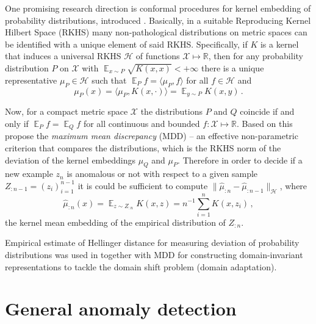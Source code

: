 \documentclass{extarticle}
\newcommand{\ex}{\mathop{\mathbb{E}}\nolimits}
\newcommand{\Hcal}{\mathcal{H}}
\newcommand{\Xcal}{\mathcal{X}}
\newcommand{\Real}{\mathbb{R}}
\begin{document}
One promising research direction is conformal procedures for kernel embedding of
probability distributions, introduced \cite{smola2007}. Basically, in a suitable
Reproducing Kernel Hilbert Space (RKHS) many non-pathological distributions on
metric spaces can be identified with a unique element of said RKHS. Specifically,
if $K$ is a kernel that induces a universal RKHS $\Hcal$ of functions $\Xcal\mapsto\Real$,
then for any probability distribution $P$ on $\Xcal$ with $\ex_{x\sim P} \sqrt{K(x,x)} < +\infty$
there is a unique representative $\mu_P\in \Hcal$ such that $\ex_P f = \langle \mu_P, f\rangle$
for all $f\in \Hcal$ and
\begin{equation*}
  \mu_P(x) = \langle \mu_P, K(x, \cdot) \rangle = \ex_{y\sim P} K(x, y) \,.
\end{equation*}

Now, for a compact metric space $\Xcal$ the distributions $P$ and $Q$ coincide if
and only if $\ex_P f = \ex_Q f$ for all continuous and bounded $f:\Xcal\mapsto \Real$.
Based on this \cite{gretton2012} propose the \textit{maximum mean discrepancy} (MDD)
-- an effective non-parametric criterion that compares the distributions, which is
the RKHS norm of the deviation of the kernel embeddings $\mu_Q$ and $\mu_P$. Therefore
in order to decide if a new example $z_n$ is anomalous or not with respect to a given
sample $Z_{:n-1} = (z_i)_{i=1}^{n-1}$ it is could be sufficient to compute
$\|\hat{\mu}_{:n} - \hat{\mu}_{:n-1}\|_\Hcal$, where
\begin{equation*}
  \hat{\mu}_{:n}(x) = \ex_{z\sim Z_{:n}} K(x, z) = n^{-1} \sum_{i=1}^n K(x, z_i) \,,
\end{equation*}
the kernel mean embedding of the empirical distribution of $Z_{:n}$.

Empirical estimate of Hellinger distance for measuring deviation of probability
distributions was used in \cite{jmlr} together with MDD for constructing domain-invariant
representations to tackle the domain shift problem (domain adaptation).


\section{General anomaly detection} %
\label{sec:general_anomaly_detection}



% 
\clearpage


\end{document}
